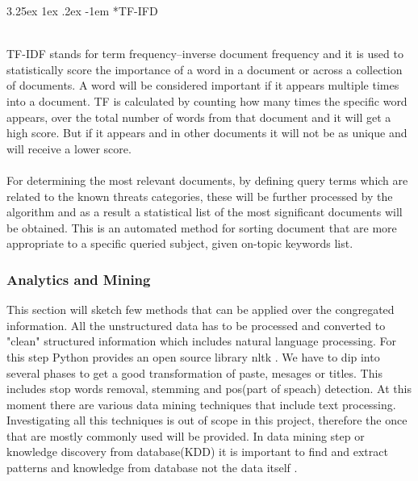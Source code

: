 \documentclass[12pt]{article}
\makeatletter
\newcounter{subsubsubsection}[subsubsection]
\renewcommand\paragraph{\@startsection{paragraph}{5}{\z@}%
  {3.25ex \@plus1ex \@minus.2ex}%
  {-1em}%
  {\normalfont\normalsize\bfseries}}
\makeatother
\begin{document}
\paragraph*{TF-IFD}
\hfill \break
\\
TF-IDF \cite{tf-idf} stands for term frequency–inverse document frequency and it is used to statistically score the importance of a word in a document or across a collection of documents. A word will be considered important if it appears multiple times into a document. TF is calculated by counting how many times the specific word appears, over the total number of words from that document and it will get a high score. But if it appears and in other documents it will not be as unique and will receive a lower score. 
\\
\\
For determining the most relevant documents, by defining query terms which are related to the known threats categories, these will be further processed by the algorithm and as a result a statistical list of the most significant documents will be obtained. This is an automated method for sorting document that are more appropriate to a specific queried subject, given on-topic keywords list.

\subsubsection{Analytics and Mining}
This section will sketch few methods that can be applied over the congregated information. All the unstructured data has to be processed and converted to "clean" structured information which includes natural language processing. For this step Python provides an open source library nltk \cite{nltk}. We have to dip into several phases to get a good transformation of  paste, mesages or titles. This includes stop words removal, stemming and pos(part of speach) detection. 
At this moment there are various data mining techniques \cite{oracle-list} that include text processing. Investigating all this techniques is out of scope in this project, therefore the once that are mostly commonly used will be provided. In data mining step or knowledge discovery from database(KDD) it is important to find and extract patterns and knowledge from database not the data itself \cite{data-kdd}.
\end{document}
